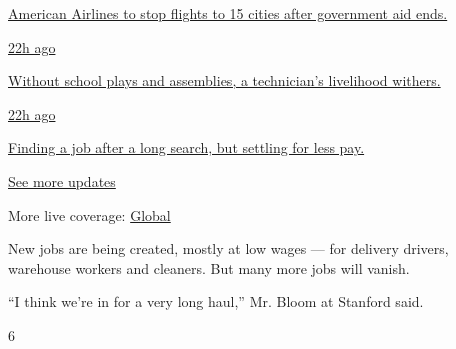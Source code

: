 \href{https://www.nytimes3xbfgragh.onion/live/2020/08/20/business/stock-market-today-coronavirus?action=click\&pgtype=Article\&state=default\&region=MAIN_CONTENT_1\&context=storylines_live_updates\#american-airlines-to-stop-flights-to-15-cities-after-government-aid-ends}{American
Airlines to stop flights to 15 cities after government aid ends.}

\href{https://www.nytimes3xbfgragh.onion/live/2020/08/20/business/stock-market-today-coronavirus?action=click\&pgtype=Article\&state=default\&region=MAIN_CONTENT_1\&context=storylines_live_updates\#without-school-plays-and-assemblies-a-technicians-livelihood-withers}{22h
ago}

\href{https://www.nytimes3xbfgragh.onion/live/2020/08/20/business/stock-market-today-coronavirus?action=click\&pgtype=Article\&state=default\&region=MAIN_CONTENT_1\&context=storylines_live_updates\#without-school-plays-and-assemblies-a-technicians-livelihood-withers}{Without
school plays and assemblies, a technician's livelihood withers.}

\href{https://www.nytimes3xbfgragh.onion/live/2020/08/20/business/stock-market-today-coronavirus?action=click\&pgtype=Article\&state=default\&region=MAIN_CONTENT_1\&context=storylines_live_updates\#finding-a-job-after-a-long-search-but-settling-for-less-pay}{22h
ago}

\href{https://www.nytimes3xbfgragh.onion/live/2020/08/20/business/stock-market-today-coronavirus?action=click\&pgtype=Article\&state=default\&region=MAIN_CONTENT_1\&context=storylines_live_updates\#finding-a-job-after-a-long-search-but-settling-for-less-pay}{Finding
a job after a long search, but settling for less pay.}

\href{https://www.nytimes3xbfgragh.onion/live/2020/08/20/business/stock-market-today-coronavirus?action=click\&pgtype=Article\&state=default\&region=MAIN_CONTENT_1\&context=storylines_live_updates}{See
more updates}

More live coverage:
\href{https://www.nytimes3xbfgragh.onion/2020/08/21/world/covid-19-coronavirus.html?action=click\&pgtype=Article\&state=default\&region=MAIN_CONTENT_1\&context=storylines_live_updates}{Global}

New jobs are being created, mostly at low wages --- for delivery
drivers, warehouse workers and cleaners. But many more jobs will vanish.

``I think we're in for a very long haul,'' Mr. Bloom at Stanford said.

6

